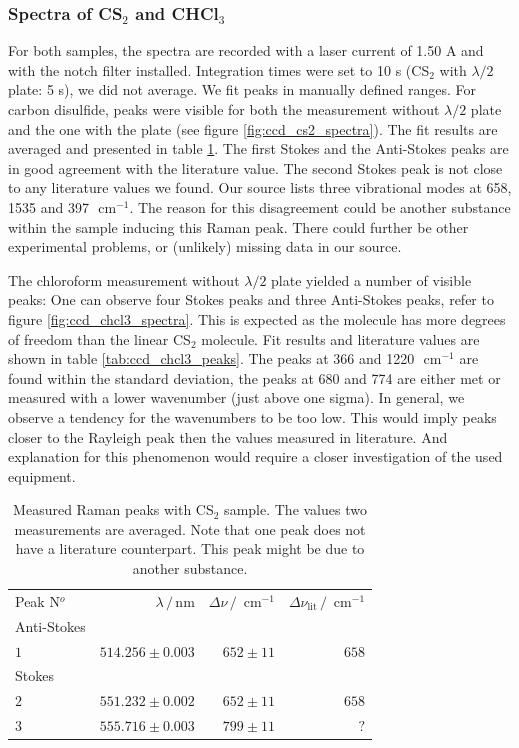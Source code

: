 \subsubsection{Spectra of CS$_2$ and CHCl$_3$}
For both samples, the spectra are recorded with a laser current of 1.50 A and with the notch filter installed. 
Integration times were set to 10 s (CS$_2$ with $\lambda / 2$ plate: 5 s), we did not average. We fit peaks in
manually defined ranges. For carbon disulfide, peaks were visible for both the measurement without $\lambda / 2$ 
plate and the one with the plate (see figure \ref{fig:ccd_cs2_spectra}). The fit results are averaged and presented 
in table \ref{tab:ccd_cs2_peaks}. The first Stokes and the Anti-Stokes peaks are in good agreement with the 
literature value. The second Stokes peak is not close to any literature values we found. Our source lists three
vibrational modes at 658, 1535 and 397 $\text{ cm}^{-1}$. The reason for this disagreement could be another 
substance within the sample inducing this Raman peak. There could further be other experimental problems, or
(unlikely) missing data in our source. 

The chloroform measurement without $\lambda / 2$ plate yielded a number of visible peaks: One can observe 
four Stokes peaks and three Anti-Stokes peaks, refer to figure \ref{fig:ccd_chcl3_spectra}. This is expected
as the molecule has more degrees of freedom than the linear CS$_2$ molecule. Fit results and literature 
values are shown in table \ref{tab:ccd_chcl3_peaks}. The peaks at 366 and 1220 $\text{ cm}^{-1} $ are
found within the standard deviation, the peaks at 680 and 774 are either met or measured with a lower wavenumber
(just above one sigma). In general, we observe a tendency for the wavenumbers to be too low. This would imply
peaks closer to the Rayleigh peak then the values measured in literature. And explanation for this phenomenon 
would require a closer investigation of the used equipment. 
\begin{table}[htpb]
    \centering
    \caption{
        Measured Raman peaks with CS$_2$ sample. The values two measurements are averaged. 
        Note that one peak does not have a literature counterpart. This peak might be due to another 
        substance. 
        }
    \label{tab:ccd_cs2_peaks}
    \begin{tabular}{l r r r}
        \rowcolor{LightCyan} Peak N$^o$ & $\lambda \, / \, \text{nm}$ &
        $\Delta \nu \, / \, \text{ cm}^{-1}$ & 
        $\Delta \nu_\text{lit} \, / \, \text{ cm}^{-1}$ \\
        \cellcolor{LightCyan}Anti-Stokes &&& \\
        \cellcolor{LightCyan}$1$ & $514.256 \pm 0.003$ & $652 \pm 11$ & $658$   \\
        \cellcolor{LightCyan}Stokes &&& \\
        \cellcolor{LightCyan}$2$ & $551.232 \pm 0.002$ & $652 \pm 11$ & $658$   \\
        \cellcolor{LightCyan}$3$ & $555.716 \pm 0.003$ & $799 \pm 11$ & $?$  
    \end{tabular}
\end{table}

